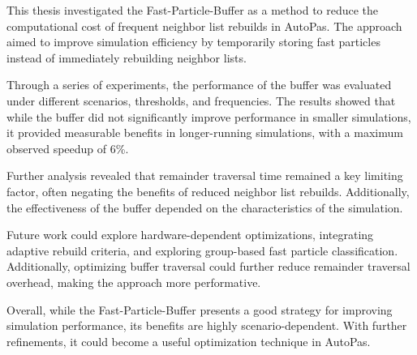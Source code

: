 This thesis investigated the Fast-Particle-Buffer as a method to reduce the computational cost of frequent neighbor list rebuilds in AutoPas. The approach aimed to improve simulation efficiency by temporarily storing fast particles instead of immediately rebuilding neighbor lists.  

Through a series of experiments, the performance of the buffer was evaluated under different scenarios, thresholds, and frequencies. The results showed that while the buffer did not significantly improve performance in smaller simulations, it provided measurable benefits in longer-running simulations, with a maximum observed speedup of 6\%.  

Further analysis revealed that remainder traversal time remained a key limiting factor, often negating the benefits of reduced neighbor list rebuilds. Additionally, the effectiveness of the buffer depended on the characteristics of the simulation.

Future work could explore hardware-dependent optimizations, integrating adaptive rebuild criteria, and exploring group-based fast particle classification. Additionally, optimizing buffer traversal could further reduce remainder traversal overhead, making the approach more performative.  

Overall, while the Fast-Particle-Buffer presents a good strategy for improving simulation performance, its benefits are highly scenario-dependent. With further refinements, it could become a useful optimization technique in AutoPas.
